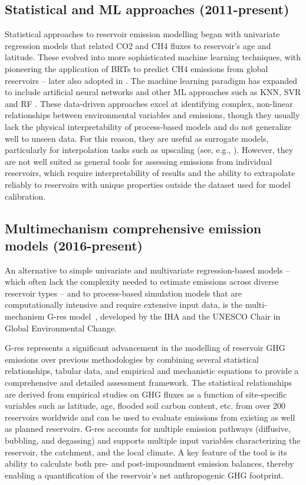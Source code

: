 \documentclass[final,1p,times]{elsarticle}
\begin{document}
\subsection{Statistical and \ac{ML} approaches (2011-present)}
Statistical approaches to reservoir emission modelling began with univariate regression models \cite{Barros2011} that related \ac{CO2} and \ac{CH4} fluxes to reservoir's age and latitude. 
These evolved into more sophisticated machine learning techniques, with \citet{Beaulieu2020b} pioneering the application of \acp{BRT} to predict \ac{CH4} emissions from global reservoirs -- later also adopted in \cite{Rocher-Ros2023}.
The machine learning paradigm has expanded to include artificial neural networks \cite{Yang2018, chen2018} and other \ac{ML} approaches such as \ac{KNN}, \ac{SVR} and \ac{RF} \cite{WANG2025123441}.
These data-driven approaches excel at identifying complex, non-linear relationships between environmental variables and emissions, though they usually lack the physical interpretability of process-based models and do not generalize well to unseen data.
For this reason, they are useful as surrogate models, particularly for interpolation tasks such as upscaling (see, e.g., \cite{Beaulieu2020b}). 
However, they are not well suited as general tools for assessing emissions from individual reservoirs, which require interpretability of results and the ability to extrapolate reliably to reservoirs with unique properties outside the dataset used for model calibration.

\subsection{Multimechanism comprehensive emission models (2016-present)}
\label{sec:multimechanism_models}

An alternative to simple univariate and multivariate regression-based models -- which often lack the complexity needed to estimate emissions across diverse reservoir types -- and to process-based simulation models that are computationally intensive and require extensive input data, is the multi-mechanism G-res model~\cite{Prairie2017b, Prairie2021}, developed by the \ac{IHA} and the UNESCO Chair in Global Environmental Change.

G-res represents a significant advancement in the modelling of reservoir \ac{GHG} emissions over previous methodologies by combining several statistical relationships, tabular data, and empirical and mechanistic equations to provide a comprehensive and detailed assessment framework.
The statistical relationships are derived from empirical studies on \ac{GHG} fluxes as a function of site-specific variables such as latitude, age, flooded soil carbon content, etc. from over 200 reservoirs worldwide and can be used to evaluate emissions from existing as well as planned reservoirs.
G-res accounts for multiple emission pathways (diffusive, bubbling, and degassing) and supports multiple input variables characterizing the reservoir, the catchment, and the local climate.
A key feature of the tool is its ability to calculate both pre- and post-impoundment emission balances, thereby enabling a quantification of the reservoir's net anthropogenic \ac{GHG} footprint.
\end{document}
